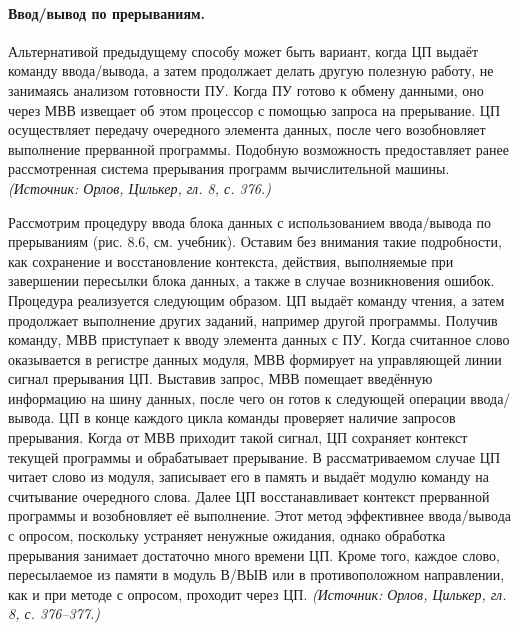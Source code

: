 \documentclass[a4paper,12pt]{article}
\begin{document}
\paragraph{Ввод/вывод по прерываниям.}
Альтернативой предыдущему способу может быть вариант, когда ЦП выдаёт команду ввода/вывода, а затем продолжает делать другую полезную работу, не занимаясь анализом готовности ПУ. Когда ПУ готово к обмену данными, оно через МВВ извещает об этом процессор с помощью запроса на прерывание. ЦП осуществляет передачу очередного элемента данных, после чего возобновляет выполнение прерванной программы. Подобную возможность предоставляет ранее рассмотренная система прерывания программ вычислительной машины.
\textit{(Источник: Орлов, Цилькер, гл. 8, с. 376.)}

Рассмотрим процедуру ввода блока данных с использованием ввода/вывода по прерываниям (рис. 8.6, см. учебник). Оставим без внимания такие подробности, как сохранение и восстановление контекста, действия, выполняемые при завершении пересылки блока данных, а также в случае возникновения ошибок. Процедура реализуется следующим образом. ЦП выдаёт команду чтения, а затем продолжает выполнение других заданий, например другой программы. Получив команду, МВВ приступает к вводу элемента данных с ПУ. Когда считанное слово оказывается в регистре данных модуля, МВВ формирует на управляющей линии сигнал прерывания ЦП. Выставив запрос, МВВ помещает введённую информацию на шину данных, после чего он готов к следующей операции ввода/вывода. ЦП в конце каждого цикла команды проверяет наличие запросов прерывания. Когда от МВВ приходит такой сигнал, ЦП сохраняет контекст текущей программы и обрабатывает прерывание. В рассматриваемом случае ЦП читает слово из модуля, записывает его в память и выдаёт модулю команду на считывание очередного слова. Далее ЦП восстанавливает контекст прерванной программы и возобновляет её выполнение. Этот метод эффективнее ввода/вывода с опросом, поскольку устраняет ненужные ожидания, однако обработка прерывания занимает достаточно много времени ЦП. Кроме того, каждое слово, пересылаемое из памяти в модуль В/ВЫВ или в противоположном направлении, как и при методе с опросом, проходит через ЦП.
\textit{(Источник: Орлов, Цилькер, гл. 8, с. 376--377.)}
\end{document}

